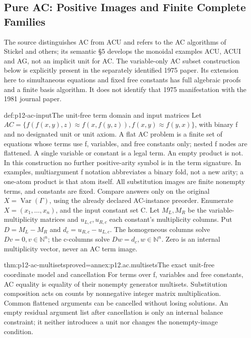 \subsection{Pure AC: Positive Images and Finite Complete Families}
\label{sec:p12-equational-ac}

The source distinguishes AC from ACU and refers to the AC algorithms
of Stickel and others; its semantic \S5 develops the monoidal examples
ACU, ACUI and AG, not an implicit unit for AC. The variable-only AC
subset construction below is explicitly present in the separately
identified 1975 paper. Its extension here to simultaneous equations and
fixed free constants has full algebraic proofs and a finite basis algorithm.
It does not identify that 1975 manifestation with the 1981 journal paper.
\cite[\S3.4 and \S5.1, pp.~484--486,504--508]{BaaderSnyder2001}
\cite[pp.~72--75]{Stickel1975AC}

\begin{hbdefinition}{def:p12-ac-input}{The unit-free term domain and input matrices}
Let \(AC=\{f(f(x,y),z)\approx f(x,f(y,z)),f(x,y)\approx f(y,x)\}\),
with binary f and no designated unit or unit axiom. A flat AC problem is a finite set of
equations whose terms use f, variables, and free constants only; nested
f nodes are flattened. A single variable or constant is a legal term.
An empty product is not. In this construction no further positive-arity
symbol is in the term signature. In examples, multiargument f notation
abbreviates a binary fold, not a new arity; a one-atom product is that
atom itself. All substitution images are finite nonempty terms, and
constants are fixed. Compare answers only on the original
\(X=\operatorname{Var}(\Gamma)\), using the already declared AC-instance
preorder. Enumerate \(X=(x_1,\ldots,x_n)\), and the input constant
set C. Let \(M_L,M_R\) be the variable-multiplicity matrices and
\(u_{L,c},u_{R,c}\) each constant's multiplicity columns. Put
\(D=M_L-M_R\) and \(d_c=u_{R,c}-u_{L,c}\).
The homogeneous columns solve \(Dv=0,v\in\mathbb N^n\);
the c-columns solve \(Dw=d_c,w\in\mathbb N^n\).
Zero is an internal multiplicity vector, never an AC term image.
\end{hbdefinition}

\begin{hblemma}{thm:p12-ac-multisets}{proved=annex:p12.ac.multisets}{The exact unit-free coordinate model and cancellation}
For terms over f, variables and free constants, AC equality is equality
of their nonempty generator multisets. Substitution composition acts on
counts by nonnegative integer matrix multiplication. Common flattened
arguments can be cancelled without losing solutions. An empty residual
argument list after cancellation is only an internal balance constraint;
it neither introduces a unit nor changes the nonempty-image condition.
\cite[pp.~72,74]{Stickel1975AC}
\end{hblemma}

